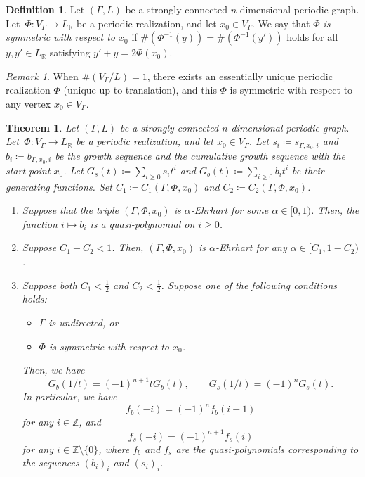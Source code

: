 \documentclass[10pt,a4paper]{amsart}
\theoremstyle{plain}
\newtheorem{thm}[cdrthm]{Theorem}
\theoremstyle{definition}
\newtheorem{defi}[cdrthm]{Definition}
\theoremstyle{remark}
\newtheorem{rmk}[cdrthm]{Remark}
\begin{document}
\begin{defi}
Let $(\Gamma , L)$ be a strongly connected $n$-dimensional periodic graph. 
Let~$\Phi : V_{\Gamma} \to L_{\mathbb{R}}$ be a periodic realization, and let $x_0 \in V_{\Gamma}$. 
We say that \textit{$\Phi$ is symmetric with respect to $x_0$} if 
$\#(\Phi ^{-1}(y)) = \#(\Phi ^{-1}(y'))$ holds for all $y, y' \in L_{\mathbb{R}}$ satisfying $y' + y = 2 \Phi(x_0)$. 
\end{defi}

\begin{rmk}
When $\# (V_{\Gamma} /L) = 1$, there exists an essentially unique periodic realization $\Phi$ (unique up to translation), 
and this $\Phi$ is symmetric with respect to any vertex $x_0 \in V_{\Gamma}$. 
\end{rmk}

\begin{thm}\label{thm:ET}
Let $(\Gamma , L)$ be a strongly connected $n$-dimensional periodic graph. 
Let~$\Phi\colon V_{\Gamma} \to L_{\mathbb{R}}$ be a periodic realization, and let $x_0 \in V_{\Gamma}$. 
Let $s_i \coloneqq  s_{\Gamma, x_0, i}$ and $b_i \coloneqq  b_{\Gamma, x_0, i}$ be 
the growth sequence and the cumulative growth sequence with the start point $x_0$. 
Let $G_s(t) \coloneqq  \sum _{i \ge 0} s_i t^i$ and $G_b(t) \coloneqq  \sum _{i \ge 0} b_i t^i$ be their generating functions. 
Set $C_1 \coloneqq  C_{1}(\Gamma, \Phi, x_0)$ and $C_2 \coloneqq  C_{2}(\Gamma, \Phi, x_0)$. 
\begin{enumerate}
\item 
Suppose that the triple $(\Gamma, \Phi, x_0)$ is $\alpha$-Ehrhart for some $\alpha \in [0,1)$. 
Then, the function $i \mapsto b_i$ is a quasi-polynomial on $i \ge 0$. 

\item 
Suppose $C_1 + C_2 < 1$. 
Then, $(\Gamma, \Phi, x_0)$ is $\alpha$-Ehrhart for any $\alpha \in [C_{1}, 1-C_{2})$. 

\item 
Suppose both $C_1 < \frac{1}{2}$ and $C_2 < \frac{1}{2}$. 
Suppose one of the following conditions holds: 
\begin{itemize}
\item[(i)] $\Gamma$ is undirected, or

\item[(ii)] $\Phi$ is symmetric with respect to $x_0$. 
\end{itemize}
Then, we have 
\[
G_b(1/t) = (-1)^{n+1} t G_b(t), \qquad 
G_s(1/t) = (-1)^n G_s(t). 
\]
In particular, we have 
\[
f_b(-i) = (-1)^n f_b(i-1)
\]
for any $i \in \mathbb{Z}$, and 
\[
f_s(-i) = (-1)^{n+1} f_s(i)
\]
for any $i \in \mathbb{Z} \setminus \{ 0 \}$, 
where $f_b$ and $f_s$ are the quasi-polynomials corresponding to the sequences $(b_i)_i$ and $(s_i)_i$. 
\end{enumerate}
\end{thm}
\end{document}
